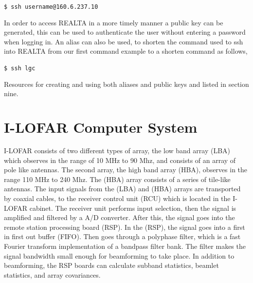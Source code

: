 \documentclass[11pt,fleqn]{book} %
\begin{document}
\vspace{3mm}

\verb|$ ssh username@160.6.237.10|

\vspace{3mm}

In order to access REALTA in a more timely manner a public key can be generated, this can be used to authenticate the user without entering a password when logging in. An alias can also be used, to shorten the command used to ssh into REALTA from our first command example to a shorten command as follows,

\vspace{3mm}
\verb|$ ssh lgc|
\vspace{3mm}

Resources for creating and using both aliases and public keys and listed in section nine.


\section{I-LOFAR Computer System}
I-LOFAR consists of two different types of array, the low band array (LBA) which observes in the range of 10 MHz to 90 Mhz, and consists of an array of pole like antennas. The second array, the high band array (HBA), observes in the range 110 MHz to 240 Mhz. The (HBA) array consists of a series of tile-like antennas. The input signals from the (LBA) and (HBA) arrays are transported by coaxial cables, to the receiver control unit (RCU) which is located in the I-LOFAR cabinet. The receiver unit performs input selection, then the signal is amplified and filtered by a A/D converter. After this, the signal goes into the remote station processing board (RSP). In the (RSP), the signal goes into a first in first out buffer (FIFO). Then goes through a polyphase filter, which is a fast Fourier transform implementation of a bandpass filter bank. The filter makes the signal bandwidth small enough for beamforming to take place. In addition to beamforming, the RSP boards can calculate subband statistics, beamlet statistics, and array covariances. 
\end{document}
